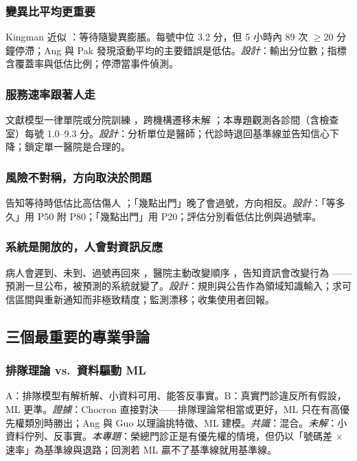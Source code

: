 \documentclass[11pt,twocolumn]{article}
\begin{document}
\subsubsection{變異比平均更重要}
Kingman 近似 \cite{hopp2011}：等待隨變異膨脹。每號中位 3.2 分，但 5 小時內 89 次 $\geq$20 分鐘停滯；Ang \cite{ang2016} 與 Pak \cite{pak2021} 發現滾動平均的主要錯誤是低估。\textit{設計}：輸出分位數；指標含覆蓋率與低估比例；停滯當事件偵測。

\subsubsection{服務速率跟著人走}
文獻模型一律單院或分院訓練 \cite{ang2016,shin2024,guo2025,liu2026}，跨機構遷移未解 \cite{toffaha2025}；本專題觀測各診間（含檢查室）每號 1.0--9.3 分。\textit{設計}：分析單位是醫師；代診時退回基準線並告知信心下降；鎖定單一醫院是合理的。

\subsubsection{風險不對稱，方向取決於問題}
告知等待時低估比高估傷人 \cite{shin2024,zhang2023}；「幾點出門」晚了會過號，方向相反。\textit{設計}：「等多久」用 P50 附 P80；「幾點出門」用 P20；評估分別看低估比例與過號率。

\subsubsection{系統是開放的，人會對資訊反應}
病人會遲到、未到、過號再回來 \cite{toffaha2025}，醫院主動改變順序 \cite{vghtpe2025}，告知資訊會改變行為 \cite{zhang2023}——預測一旦公布，被預測的系統就變了。\textit{設計}：規則與公告作為領域知識輸入；求可信區間與重新通知而非極致精度；監測漂移；收集使用者回報。

\subsection{三個最重要的專業爭論}
\subsubsection{排隊理論 vs.\ 資料驅動 ML}
A：排隊模型有解析解、小資料可用、能答反事實。B：真實門診違反所有假設，ML 更準。\textit{證據}：Chocron \cite{chocron2022} 直接對決——排隊理論常相當或更好，ML 只在有高優先權類別時勝出；Ang \cite{ang2016} 與 Guo \cite{guo2025} 以理論挑特徵、ML 建模。\textit{共識}：混合。\textit{未解}：小資料佇列、反事實。\textit{本專題}：榮總門診正是有優先權的情境，但仍以「號碼差 $\times$ 速率」為基準線與退路；回測若 ML 贏不了基準線就用基準線。
\end{document}
